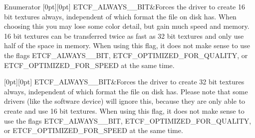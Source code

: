 \begin{DoxyEnumFields}{Enumerator}
[0pt][0pt]{}\mbox{\label{namespaceirr_1_1video_acaf6f7414534f7d62bff18c5bf11876fabecb9e1d0b012d6393809a80e0041bf8}} 
E\+T\+C\+F\+\_\+\+A\+L\+W\+A\+Y\+S\+\_\+\_\+\+B\+IT&Forces the driver to create 16 bit textures always, independent of which format the file on disk has. When choosing this you may lose some color detail, but gain much speed and memory. 16 bit textures can be transferred twice as fast as 32 bit textures and only use half of the space in memory. When using this flag, it does not make sense to use the flags E\+T\+C\+F\+\_\+\+A\+L\+W\+A\+Y\+S\+\_\+\_\+\+B\+IT, E\+T\+C\+F\+\_\+\+O\+P\+T\+I\+M\+I\+Z\+E\+D\+\_\+\+F\+O\+R\+\_\+\+Q\+U\+A\+L\+I\+TY, or E\+T\+C\+F\+\_\+\+O\+P\+T\+I\+M\+I\+Z\+E\+D\+\_\+\+F\+O\+R\+\_\+\+S\+P\+E\+ED at the same time. \\
\hline

[0pt][0pt]{}\mbox{\label{namespaceirr_1_1video_acaf6f7414534f7d62bff18c5bf11876fadc16ca39b451f846d5611ac2b213620a}} 
E\+T\+C\+F\+\_\+\+A\+L\+W\+A\+Y\+S\+\_\+\_\+\+B\+IT&Forces the driver to create 32 bit textures always, independent of which format the file on disk has. Please note that some drivers (like the software device) will ignore this, because they are only able to create and use 16 bit textures. When using this flag, it does not make sense to use the flags E\+T\+C\+F\+\_\+\+A\+L\+W\+A\+Y\+S\+\_\+\_\+\+B\+IT, E\+T\+C\+F\+\_\+\+O\+P\+T\+I\+M\+I\+Z\+E\+D\+\_\+\+F\+O\+R\+\_\+\+Q\+U\+A\+L\+I\+TY, or E\+T\+C\+F\+\_\+\+O\+P\+T\+I\+M\+I\+Z\+E\+D\+\_\+\+F\+O\+R\+\_\+\+S\+P\+E\+ED at the same time. \\
\hline


\end{DoxyEnumFields}
